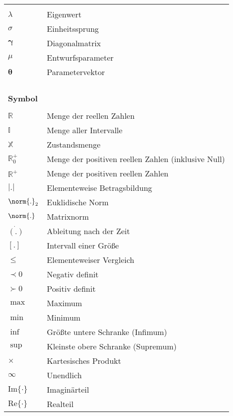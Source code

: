 \begin{supertabular*}{\textwidth}{ll}
\hline
\\
$\lambda$               &		Eigenwert \\
$\sigma$		&		Einheitssprung\\
$\boldsymbol\gamma$	&		Diagonalmatrix\\
$\mu$			&		Entwurfsparameter\\
$\boldsymbol\theta$		&		Parametervektor\\
\\
\\
 \\
\\
\hline 
{\bfseries Symbol}					&		{\bfseries {}} \\
\hline
\\
$\mathbb R$           		&	Menge der reellen Zahlen \\
$\mathbb I$			&	Menge aller Intervalle\\
$\mathbb X$			&	Zustandsmenge\\
$\mathbb R^+_0$		&	Menge der positiven reellen Zahlen (inklusive Null) \\
$\mathbb R^+$		&	Menge der positiven reellen Zahlen\\
$|.|$				&	Elementeweise Betragsbildung\\
$\norm{.}_2$		&	Euklidische Norm \\
$\norm{.}$			&	Matrixnorm\\
$\dot{(.)}$			&	Ableitung nach der Zeit\\
$[.]$				&	Intervall einer Gr\"o\ss e\\
$\leq$				&	Elementeweiser Vergleich\\
$\prec 0$		 	&	Negativ definit\\
$\succ 0$			&	Positiv definit\\
$\max$			&	Maximum\\
$\min$			&	Minimum\\
$\inf$				&	Gr\"o\ss te untere Schranke (Infimum)\\
$\sup$			&	Kleinste obere Schranke (Supremum)\\
$\times$			&	Kartesisches Produkt\\
$\infty$			&	Unendlich\\
$\text{Im}\{\cdot\}$	&	Imagin\"arteil\\
$\text{Re}\{\cdot\}$	&	Realteil\\

\end{supertabular*}
